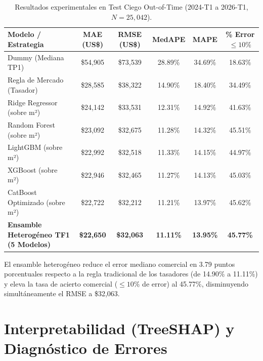 \documentclass[11pt,a4paper]{article}
\begin{document}
\begin{table}[H]
\centering
\small
\caption{Resultados experimentales en Test Ciego Out-of-Time (2024-T1 a 2026-T1, $N=25,042$).}
\label{tab:resultados_experimentales}
\begin{tabular}{l c c c c c}
\toprule
\textbf{Modelo / Estrategia} & \textbf{MAE (US\$)} & \textbf{RMSE (US\$)} & \textbf{MedAPE} & \textbf{MAPE} & \textbf{\% Error $\le 10\%$} \\
\midrule
Dummy (Mediana TP1) & \$54,905 & \$73,539 & 28.89\% & 34.69\% & 18.63\% \\
Regla de Mercado (Tasador) & \$28,585 & \$38,322 & 14.90\% & 18.40\% & 34.49\% \\
Ridge Regressor (sobre m²) & \$24,142 & \$33,531 & 12.31\% & 14.92\% & 41.63\% \\
Random Forest (sobre m²) & \$23,092 & \$32,675 & 11.28\% & 14.32\% & 45.51\% \\
LightGBM (sobre m²) & \$22,992 & \$32,518 & 11.33\% & 14.15\% & 44.97\% \\
XGBoost (sobre m²) & \$22,946 & \$32,465 & 11.27\% & 14.13\% & 45.03\% \\
CatBoost Optimizado (sobre m²) & \$22,722 & \$32,212 & 11.21\% & 13.97\% & 45.62\% \\
\textbf{Ensamble Heterogéneo TF1 (5 Modelos)} & \textbf{\$22,650} & \textbf{\$32,063} & \textbf{11.11\%} & \textbf{13.95\%} & \textbf{45.77\%} \\
\bottomrule
\end{tabular}
\end{table}

El ensamble heterogéneo reduce el error mediano comercial en 3.79 puntos porcentuales respecto a la regla tradicional de los tasadores (de 14.90\% a 11.11\%) y eleva la tasa de acierto comercial ($\le 10\%$ de error) al 45.77\%, disminuyendo simultáneamente el RMSE a \$32,063.

\section{Interpretabilidad (TreeSHAP) y Diagnóstico de Errores}
\end{document}
